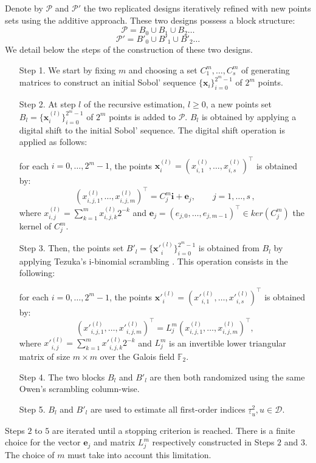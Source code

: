 \documentclass[]{elsarticle}
\theoremstyle{definition}
\newcommand{\bvec}[1]{\boldsymbol{#1}}
\newcommand{\vx}{\bvec{x}}
\newcommand{\vi}{\bvec{i}}
\newcommand{\ve}{\bvec{e}}
\begin{document}
Denote by $\mathcal{P}$ and $\mathcal{P}'$ the two replicated designs iteratively refined with new points sets using the additive approach. These two designs possess a block structure:
$$\mathcal{P}= B_0 \cup B_1 \cup B_2 \dots $$
$$\mathcal{P}'= {B'}_0 \cup {B'}_1 \cup {B'}_2 \dots $$
We detail below the steps of the construction of these two designs.
\begin{enumerate}
\item[Step 1.] We start by fixing $m$ and choosing a set $C_1^{m},\dots,C_s^{m}$ of generating matrices to construct an initial Sobol' sequence $\{\vx_i\}_{i=0}^{2^m-1}$ of $2^m$ points. \\

\item[Step 2.] At step $l$ of the recursive estimation, $l \geq 0$, a new points set $B_l=\{\vx_i^{(l)}\}_{i=0}^{2^m-1}$ of $2^m$ points is added to $\mathcal{P}$. $B_l$ is obtained by applying a digital shift to the initial Sobol' sequence. The digital shift operation is applied as follows:

for each $i=0,\dots,2^m-1$, the points $\vx_i^{(l)} = (x_{i,1}^{(l)},\dots,x_{i,s}^{(l)})^\intercal$ is obtained by:
\begin{equation}
\label{dig.shift}
(x_{i,j,1}^{(l)},\dots,x_{i,j,m}^{(l)})^\intercal = C_j^m \vi+\ve_j,\qquad j= 1,\dots,s\, ,
\end{equation}
where $ x_{i,j}^{(l)}=\sum_{k = 1}^mx_{i,j,k}^{(l)}2^{-k}$ and $\ve_j=(e_{j,{0}},\dots,e_{j,{m-1}})^\intercal \in ker(C_j^m)$ the kernel of $C_j^m$.\\

\item[Step 3.] Then, the points set ${B'}_l=\{{\vx'}_i^{(l)}\}_{i=0}^{2^m-1}$ is obtained from $B_l$ by applying Tezuka's i-binomial scrambling \cite{tezuka}. This operation consists in the following: 

for each $i=0,\dots,2^m-1$, the points ${\vx'}_i^{(l)} = ({x'}_{i,1}^{(l)},\dots,{x'}_{i,s}^{(l)})^\intercal$ is obtained by:
\begin{equation}
\label{ibinom.scrambling}
({x'}_{i,j,1}^{(l)},\dots,{x'}_{i,j,m}^{(l)})^\intercal = L_j^m (x_{i,j,1}^{(l)},\dots,x_{i,j,m}^{(l)})^\intercal,
\end{equation}
where $ {x'}_{i,j}^{(l)}=\sum_{k = 1}^m{x'}_{i,j,k}^{(l)}2^{-k}$ and $L_j^m$ is an invertible lower triangular matrix of size $m \times m$ over the Galois field $\mathbb{F}_2$.\\

\item[Step 4.] The two blocks $B_l$ and ${B'}_l$ are then both randomized using the same Owen's scrambling column-wise.

\item[Step 5.] $B_l$ and ${B'}_l$ are used to estimate all first-order indices $\underline{\tau}_u^2, u \in \mathcal{D}$.
\end{enumerate}
Steps $2$ to $5$ are iterated until a stopping criterion is reached. There is a finite choice for the vector $\ve_j$ and matrix $L_j^m$ respectively constructed in Steps $2$ and $3$. %
The choice of $m$ must take into account this limitation.
\end{document}
